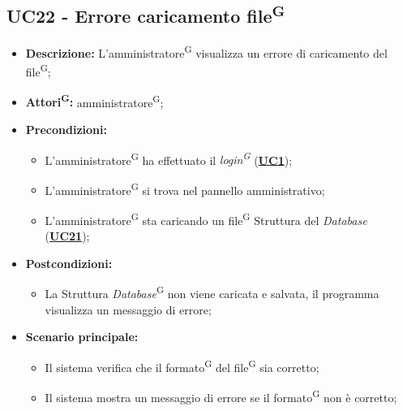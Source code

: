 \subsection{UC22 - Errore caricamento file\textsuperscript{G}}
\label{sec:UC22}
\begin{itemize}
	\item \textbf{Descrizione:} L’amministratore\textsuperscript{G} visualizza un errore di caricamento del file\textsuperscript{G};
	\item \textbf{Attori\textsuperscript{G}:} amministratore\textsuperscript{G};
	\item \textbf{Precondizioni:} 
	\begin{itemize}
		\item L’amministratore\textsuperscript{G} ha effettuato il \textit{login\textsuperscript{G}} (\hyperref[sec:UC1]{\textbf{UC1}});
		\item L’amministratore\textsuperscript{G} si trova nel pannello amministrativo;
		\item L’amministratore\textsuperscript{G} sta caricando un file\textsuperscript{G} Struttura del \textit{Database} (\hyperref[sec:UC21]{\textbf{UC21}});
	\end{itemize}
	\item \textbf{Postcondizioni:} 
	\begin{itemize}
		\item La Struttura \textit{Database}\textsuperscript{G} non viene caricata e salvata, il programma visualizza un messaggio di errore;
	\end{itemize}
	\item \textbf{Scenario principale:} 
	\begin{itemize}
		\item Il sistema verifica che il formato\textsuperscript{G} del file\textsuperscript{G} sia corretto;
		\item Il sistema mostra un messaggio di errore se il formato\textsuperscript{G} non è corretto;
	\end{itemize}
\end{itemize}


